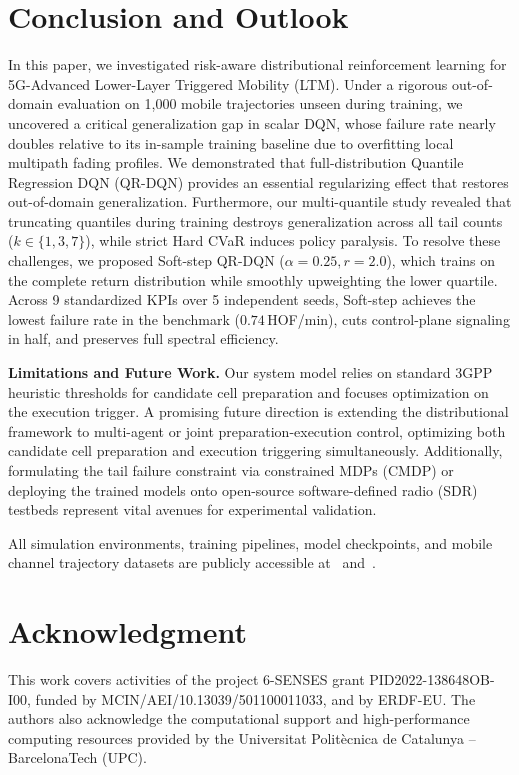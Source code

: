 \documentclass{ieeetmlcn}
\begin{document}
\section{Conclusion and Outlook}
\label{sec:conclusion}
In this paper, we investigated risk-aware distributional reinforcement learning for 5G-Advanced Lower-Layer Triggered Mobility (LTM). Under a rigorous out-of-domain evaluation on 1,000 mobile trajectories unseen during training, we uncovered a critical generalization gap in scalar DQN, whose failure rate nearly doubles relative to its in-sample training baseline due to overfitting local multipath fading profiles. We demonstrated that full-distribution Quantile Regression DQN (QR-DQN) provides an essential regularizing effect that restores out-of-domain generalization. Furthermore, our multi-quantile study revealed that truncating quantiles during training destroys generalization across all tail counts ($k \in \{1, 3, 7\}$), while strict Hard CVaR induces policy paralysis. To resolve these challenges, we proposed Soft-step QR-DQN ($\alpha=0.25, r=2.0$), which trains on the complete return distribution while smoothly upweighting the lower quartile. Across 9 standardized KPIs over 5 independent seeds, Soft-step achieves the lowest failure rate in the benchmark ($0.74$\,HOF/min), cuts control-plane signaling in half, and preserves full spectral efficiency.

\textbf{Limitations and Future Work.} Our system model relies on standard 3GPP heuristic thresholds for candidate cell preparation and focuses optimization on the execution trigger. A promising future direction is extending the distributional framework to multi-agent or joint preparation-execution control, optimizing both candidate cell preparation and execution triggering simultaneously. Additionally, formulating the tail failure constraint via constrained MDPs (CMDP) or deploying the trained models onto open-source software-defined radio (SDR) testbeds represent vital avenues for experimental validation.

All simulation environments, training pipelines, model checkpoints, and mobile channel trajectory datasets are publicly accessible at~\cite{code} and~\cite{dataset}.

\section*{Acknowledgment}
This work covers activities of the project 6-SENSES grant PID2022-138648OB-I00, funded by MCIN/AEI/10.13039/501100011033, and by ERDF-EU. The authors also acknowledge the computational support and high-performance computing resources provided by the Universitat Polit\`ecnica de Catalunya -- BarcelonaTech (UPC).



\end{document}
